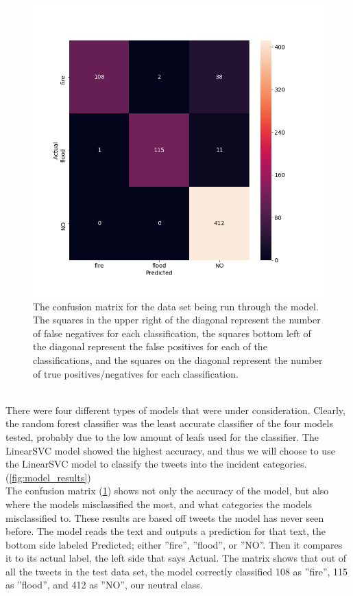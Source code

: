 \documentclass[titlepage, 12pt]{article}
\begin{document}
\begin{figure}[h!]
\centering
\includegraphics[scale=0.5]{pics/confusion.png}
\caption{The confusion matrix for the data set being run through the model. The squares in the upper right of the diagonal represent the number of false negatives for each classification, the squares bottom left of the diagonal represent the false positives for each of the classifications, and the squares on the diagonal represent the number of true positives/negatives for each classification.}
\label{fig:confusion_matrix}
\end{figure}\\

There were four different types of models that were under consideration. Clearly, the random forest classifier was the least accurate classifier of the four models tested, probably due to the low amount of leafs used for the classifier. The LinearSVC model showed the highest accuracy, and thus we will choose to use the LinearSVC model to classify the tweets into the incident categories. (\ref{fig:model_results})\\

 The confusion matrix (\ref{fig:confusion_matrix}) shows not only the accuracy of the model, but also where the models misclassified the most, and what categories the models misclassified to. These results are based off tweets the model has never seen before. The model reads the text and outputs a prediction for that text, the bottom side labeled Predicted; either ''fire'', ''flood'', or ''NO''. Then it compares it to its actual label, the left side that says Actual. The matrix shows that out of all the tweets in the test data set, the model correctly classified 108 as ''fire'', 115 as ''flood'', and 412 as ''NO'', our neutral class.\\
 
\end{document}
